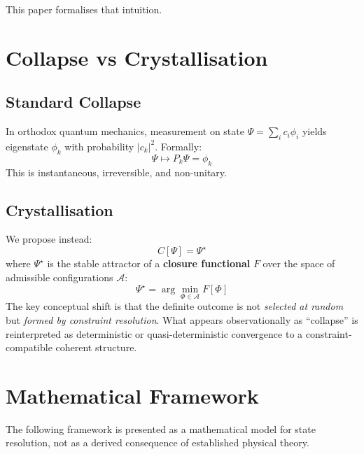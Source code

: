 \documentclass[12pt]{article}
\begin{document}
This paper formalises that intuition.

\section{Collapse vs Crystallisation}

\subsection{Standard Collapse}

In orthodox quantum mechanics, measurement on state $\Psi = \sum_i c_i \phi_i$ yields eigenstate $\phi_k$ with probability $|c_k|^2$. Formally:
\begin{equation}
\Psi \mapsto P_k \Psi = \phi_k
\end{equation}
This is instantaneous, irreversible, and non-unitary.

\subsection{Crystallisation}

We propose instead:
\begin{equation}
C[\Psi] = \Psi^{\star}
\end{equation}
where $\Psi^{\star}$ is the stable attractor of a \textbf{closure functional} $F$ over the space of admissible configurations $\mathcal{A}$:
\begin{equation}
\Psi^{\star} = \arg\min_{\Phi \in \mathcal{A}} F[\Phi]
\end{equation}
The key conceptual shift is that the definite outcome is not \textit{selected at random} but \textit{formed by constraint resolution}. What appears observationally as ``collapse'' is reinterpreted as deterministic or quasi-deterministic convergence to a constraint-compatible coherent structure.

\section{Mathematical Framework}

The following framework is presented as a mathematical model for state resolution, not as a derived consequence of established physical theory.
\end{document}
